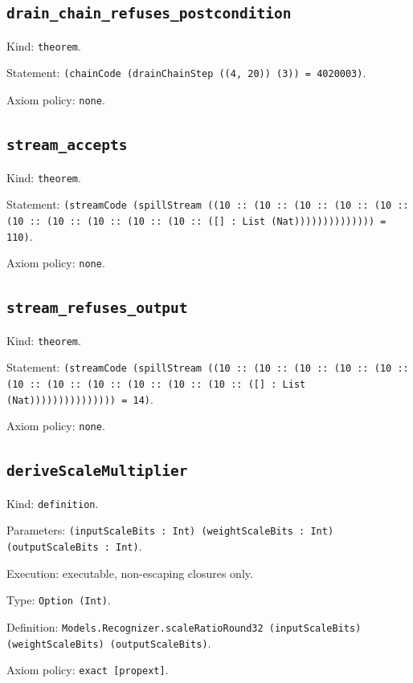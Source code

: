 \documentclass[11pt]{article}
\begin{document}
\subsection*{\texttt{drain\_chain\_refuses\_postcondition}}
\noindent Kind: \texttt{theorem}.\par
\noindent Statement: \texttt{(chainCode (drainChainStep ((4, 20)) (3)) = 4020003)}.\par
\noindent Axiom policy: \texttt{none}.\par
\subsection*{\texttt{stream\_accepts}}
\noindent Kind: \texttt{theorem}.\par
\noindent Statement: \texttt{(streamCode (spillStream ((10 :: (10 :: (10 :: (10 :: (10 :: (10 :: (10 :: (10 :: (10 :: (10 :: ([] : List (Nat)))))))))))))) = 110)}.\par
\noindent Axiom policy: \texttt{none}.\par
\subsection*{\texttt{stream\_refuses\_output}}
\noindent Kind: \texttt{theorem}.\par
\noindent Statement: \texttt{(streamCode (spillStream ((10 :: (10 :: (10 :: (10 :: (10 :: (10 :: (10 :: (10 :: (10 :: (10 :: (10 :: ([] : List (Nat))))))))))))))) = 14)}.\par
\noindent Axiom policy: \texttt{none}.\par
\subsection*{\texttt{deriveScaleMultiplier}}
\noindent Kind: \texttt{definition}.\par
\noindent Parameters: \texttt{(inputScaleBits : Int) (weightScaleBits : Int) (outputScaleBits : Int)}.\par
\noindent Execution: executable, non-escaping closures only.\par
\noindent Type: \texttt{Option (Int)}.\par
\noindent Definition: \texttt{Models.Recognizer.scaleRatioRound32 (inputScaleBits) (weightScaleBits) (outputScaleBits)}.\par
\noindent Axiom policy: \texttt{exact [propext]}.\par
\end{document}
